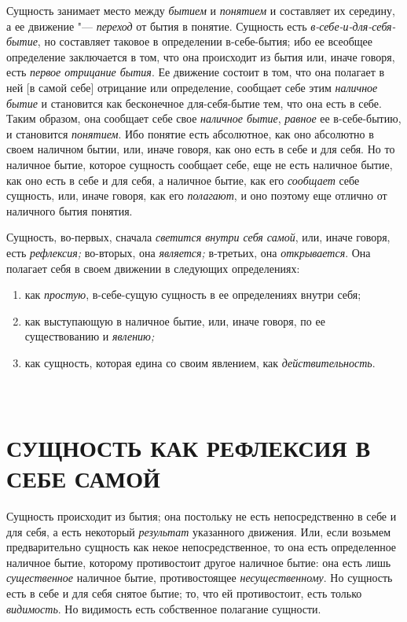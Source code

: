 Сущность занимает место между {\em бытием} и
{\em понятием} и составляет их середину, а ее движение
"--- {\em переход} от бытия в понятие. Сущность есть
{\em в-себе-и-для-себя-бытие}, но составляет таковое в
определении в-себе-бытия; ибо ее всеобщее определение заключается в том,
что она происходит из бытия или, иначе говоря, есть
{\em первое отрицание бытия}. Ее движение состоит в
том, что она полагает в ней [в самой себе] отрицание или определение,
сообщает себе этим {\em наличное бытие} и становится
как бесконечное для-себя-бытие тем, что она есть в себе. Таким образом, она
сообщает себе свое {\em наличное бытие},
{\em равное} ее в-себе-бытию, и становится
{\em понятием}. Ибо понятие есть абсолютное, как оно
абсолютно в своем наличном бытии, или, иначе говоря, как оно есть в себе и
для себя. Но то наличное бытие, которое сущность сообщает себе, еще не есть
наличное бытие, как оно есть в себе и для себя, а наличное бытие, как его
{\em сообщает} себе сущность, или, иначе говоря, как
его {\em полагают}, и оно поэтому еще отлично от
наличного бытия понятия.

Сущность, во-первых, сначала {\em светится внутри себя
самой}, или, иначе говоря, есть {\em рефлексия;}
во-вторых, она {\em является;} в-третьих, она
{\em открывается}. Она полагает себя в своем движении в
следующих определениях:
\begin{enumerate}[~~~~I.]
\item как {\em простую}, в-себе-сущую сущность в ее определениях внутри себя;
\item как выступающую в наличное бытие, или, иначе
  говоря, по ее существованию и {\em явлению;}
\item как сущность, которая едина со своим
  явлением, как {\em действительность}.
\end{enumerate}

\clearpage


\part[\small СУЩНОСТЬ КАК РЕФЛЕКСИЯ В СЕБЕ САМОЙ]%
     {\fontsize{9}{11}\selectfont{\mdseries ПЕРВЫЙ ОТДЕЛ}\\%
      \normalsize СУЩНОСТЬ КАК РЕФЛЕКСИЯ В СЕБЕ САМОЙ}

Сущность происходит из бытия; она постольку не
есть непосредственно в себе и для себя, а есть некоторый
{\em результат} указанного движения. Или, если возьмем
предварительно сущность как некое непосредственное, то она есть
определенное наличное бытие, которому противостоит другое наличное бытие:
она есть лишь {\em существенное} наличное бытие,
противостоящее {\em несущественному}. Но сущность есть
в себе и для себя снятое бытие; то, что ей противостоит, есть только
{\em видимость}. Но видимость есть собственное полагание сущности.

